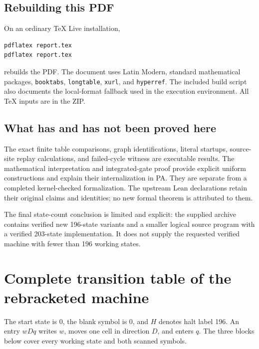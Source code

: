 \documentclass[11pt,letterpaper]{article}
\begin{document}
\subsection{Rebuilding this PDF}
On an ordinary TeX Live installation,
\begin{lstlisting}
pdflatex report.tex
pdflatex report.tex
\end{lstlisting}
rebuilds the PDF. The document uses Latin Modern, standard mathematical
packages, \texttt{booktabs}, \texttt{longtable}, \texttt{xurl}, and
\texttt{hyperref}. The included build script also documents the local-format
fallback used in the execution environment. All TeX inputs are in the ZIP.

\subsection{What has and has not been proved here}
The exact finite table comparisons, graph identifications, literal startups,
source-site replay calculations, and failed-cycle witness are executable
results. The mathematical interpretation and integrated-gate proof provide
explicit uniform constructions and explain their internalization in PA.
They are separate from a completed kernel-checked formalization. The
upstream Lean declarations retain their original claims and identities;
no new formal theorem is attributed to them.

The final state-count conclusion is limited and explicit: the supplied
archive contains verified new 196-state variants and a smaller logical
source program with a verified 203-state implementation. It does not supply
the requested verified machine with fewer than 196 working states.

\appendix

\section{Complete transition table of the rebracketed machine}
\label{app:table}
The start state is 0, the blank symbol is 0, and $H$ denotes halt label 196.
An entry $wDq$ writes $w$, moves one cell in direction $D$, and enters $q$.
The three blocks below cover every working state and both scanned symbols.

\end{document}
